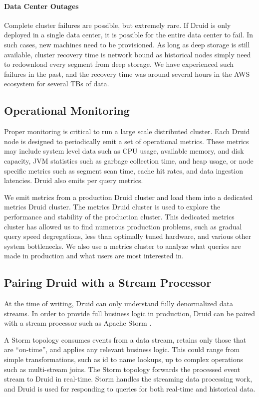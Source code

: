 \documentclass{sig-alternate-2013}
\begin{document}
\paragraph{Data Center Outages}
Complete cluster failures are possible, but extremely rare. If Druid is
only deployed in a single data center, it is possible for the entire data
center to fail. In such cases, new machines need to be provisioned. As long as
deep storage is still available, cluster recovery time is network bound as
historical nodes simply need to redownload every segment from deep storage. We
have experienced such failures in the past, and the recovery time was around
several hours in the AWS ecosystem for several TBs of data.

\subsection{Operational Monitoring}
Proper monitoring is critical to run a large scale distributed cluster.
Each Druid node is designed to periodically emit a set of operational metrics.
These metrics may include system level data such as CPU usage, available
memory, and disk capacity, JVM statistics such as garbage collection time, and
heap usage, or node specific metrics such as segment scan time, cache
hit rates, and data ingestion latencies. Druid also emits per query metrics.

We emit metrics from a production Druid cluster and load them into a dedicated
metrics Druid cluster. The metrics Druid cluster is used to explore the
performance and stability of the production cluster. This dedicated metrics
cluster has allowed us to find numerous production problems, such as gradual
query speed degregations, less than optimally tuned hardware, and various other
system bottlenecks. We also use a metrics cluster to analyze what queries are
made in production and what users are most interested in. 

\subsection{Pairing Druid with a Stream Processor}
At the time of writing, Druid can only understand fully denormalized data
streams. In order to provide full business logic in production, Druid can be
paired with a stream processor such as Apache Storm \cite{marz2013storm}.

A Storm topology consumes events from a data stream, retains only those that are
“on-time”, and applies any relevant business logic. This could range from
simple transformations, such as id to name lookups, up to complex operations
such as multi-stream joins. The Storm topology forwards the processed event
stream to Druid in real-time. Storm handles the streaming data processing work,
and Druid is used for responding to queries for both real-time and
historical data. 
\end{document}
